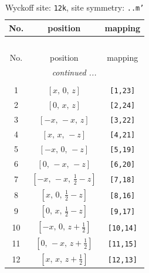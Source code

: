 \documentclass[fleqn,8pt]{jsarticle}
\begin{document}
\begin{longtable}{ccc}
\caption{Wyckoff site: {\tt 12k}, site symmetry: {\tt ..m'}}
 \\
 \hline \hline
No. & position & mapping \\ \hline \endfirsthead

\multicolumn{2}{l}{\tablename\ \thetable{}} \\
 \hline \hline
No. & position & mapping \\ \hline \endhead

 \hline \hline
\multicolumn{2}{r}{\footnotesize\it continued ...} \\ \endfoot

 \hline \hline
\multicolumn{2}{r}{} \\ \endlastfoot

1 & $\left[ x,\, 0,\, z \right]$ & {\tt [1,23]} \\ \hline
2 & $\left[ 0,\, x,\, z \right]$ & {\tt [2,24]} \\ \hline
3 & $\left[ - x,\, - x,\, z \right]$ & {\tt [3,22]} \\ \hline
4 & $\left[ x,\, x,\, - z \right]$ & {\tt [4,21]} \\ \hline
5 & $\left[ - x,\, 0,\, - z \right]$ & {\tt [5,19]} \\ \hline
6 & $\left[ 0,\, - x,\, - z \right]$ & {\tt [6,20]} \\ \hline
7 & $\left[ - x,\, - x,\, \frac{1}{2} - z \right]$ & {\tt [7,18]} \\ \hline
8 & $\left[ x,\, 0,\, \frac{1}{2} - z \right]$ & {\tt [8,16]} \\ \hline
9 & $\left[ 0,\, x,\, \frac{1}{2} - z \right]$ & {\tt [9,17]} \\ \hline
10 & $\left[ - x,\, 0,\, z + \frac{1}{2} \right]$ & {\tt [10,14]} \\ \hline
11 & $\left[ 0,\, - x,\, z + \frac{1}{2} \right]$ & {\tt [11,15]} \\ \hline
12 & $\left[ x,\, x,\, z + \frac{1}{2} \right]$ & {\tt [12,13]} \\
\end{longtable}
\renewcommand{\arraystretch}{1.2}
\end{document}
